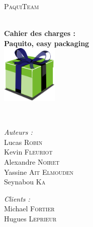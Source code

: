\begin{titlepage}
	\begin{center}
	
		
		\vfill
					
		\textsc{\LARGE PaquiTeam}\\[1.5cm]
		
		\HRule \\[0.4cm]
			{ \huge \bfseries Cahier des charges :\\
			Paquito, easy packaging\\[0.4cm]
			\includegraphics[width=0.2\textwidth]{../img/paquito.png}
	
			}
		\HRule \\[1.5cm]
		
		\begin{minipage}{0.40\textwidth}
			\begin{flushleft} \large
				\emph{Auteurs :}\\
				Lucas \textsc{Robin}\\
				Kevin \textsc{Fleuriot}\\
				Alexandre \textsc{Noiret}\\
				Yassine \textsc{Ait Elmouden}\\
				Seynabou \textsc{Ka}
			\end{flushleft}
		\end{minipage}
		\hfill
		\begin{minipage}{0.40\textwidth}
			\begin{flushright} \large
				\emph{Clients :}\\
				Michael \textsc{Fortier}\\
				Hugues \textsc{Leprieur}
			\end{flushright}
		\end{minipage}


\end{center}
\end{titlepage}
